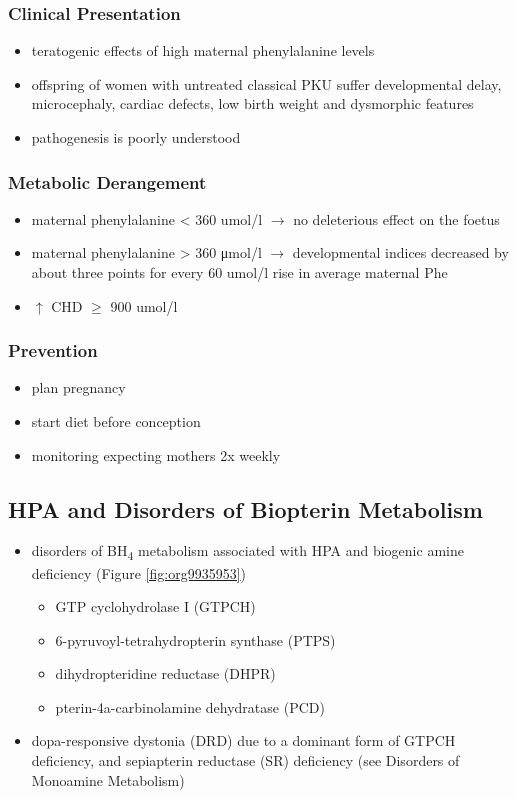 \documentclass{scrartcl}
\begin{document}
\subsubsection{Clinical Presentation}
\label{sec:orgf67b3e2}
\begin{itemize}
\item teratogenic effects of high maternal phenylalanine levels
\item offspring of women with untreated classical PKU suffer developmental
delay, microcephaly, cardiac defects, low birth weight and
dysmorphic features
\item pathogenesis is poorly understood
\end{itemize}
\subsubsection{Metabolic Derangement}
\label{sec:org407a7ad}
\begin{itemize}
\item maternal phenylalanine \textless{} 360 umol/l \(\to\) no deleterious effect on the foetus
\item maternal phenylalanine \textgreater{} 360 μmol/l \(\to\) developmental indices
decreased by about three points for every 60 umol/l rise in average
maternal Phe
\item \(\uparrow\) CHD \(\ge\) 900 umol/l
\end{itemize}
\subsubsection{Prevention}
\label{sec:org73aab80}
\begin{itemize}
\item plan pregnancy
\item start diet before conception
\item monitoring expecting mothers 2x weekly
\end{itemize}

\subsection{HPA and Disorders of Biopterin Metabolism}
\label{sec:orgb672ef4}
\begin{itemize}
\item disorders of BH\textsubscript{4} metabolism associated with HPA and biogenic amine deficiency (Figure \ref{fig:org9935953})
\begin{itemize}
\item GTP cyclohydrolase I (GTPCH)
\item 6-pyruvoyl-tetrahydropterin synthase (PTPS)
\item dihydropteridine reductase (DHPR)
\item pterin-4a-carbinolamine dehydratase (PCD)
\end{itemize}
\item dopa-responsive dystonia (DRD) due to a dominant form of GTPCH
deficiency, and sepiapterin reductase (SR) deficiency (see Disorders of Monoamine Metabolism)
\end{itemize}
\end{document}
